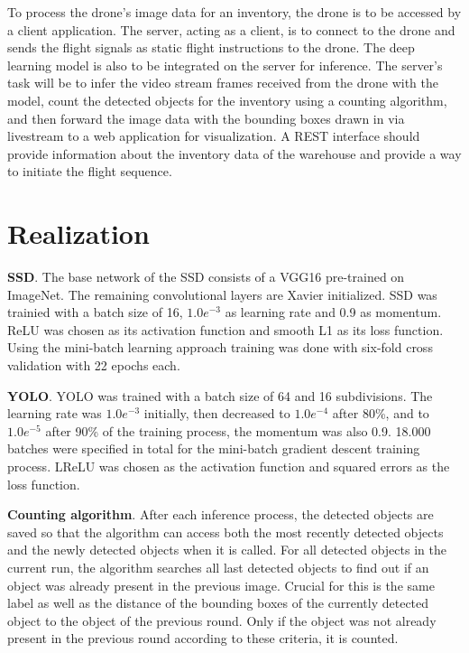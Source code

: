\documentclass[a4paper, 10pt, journal]{wissarbIEEE}      %
\begin{document}
To process the drone's image data for an inventory, the drone is to be accessed by a client application. The server, acting as a client, is to connect to the drone and sends the flight signals as static flight instructions to the drone. The deep learning model is also to be integrated on the server for inference. The server's task will be to infer the video stream frames received from the drone with the model, count the detected objects for the inventory using a counting algorithm, and then forward the image data with the bounding boxes drawn in via livestream to a web application for visualization. A REST interface should provide information about the inventory data of the warehouse and provide a way to initiate the flight sequence.

\section{Realization} \label{realization}

\textbf{SSD}. The base network of the SSD consists of a VGG16 pre-trained on ImageNet. The remaining convolutional layers are Xavier initialized. SSD was trainied with a batch size of 16, $1.0e^{-3}$ as learning rate and 0.9 as momentum. ReLU was chosen as its activation function and smooth L1 as its loss function. Using the mini-batch learning approach training was done with six-fold cross validation with 22 epochs each.

\textbf{YOLO}. YOLO was trained with a batch size of 64 and 16 subdivisions. The learning rate was $1.0e^{-3}$ initially, then decreased to $1.0e^{-4}$ after 80\%, and to $1.0e^{-5}$ after 90\% of the training process, the momentum was also 0.9. 18.000 batches were specified in total for the mini-batch gradient descent training process. LReLU was chosen as the activation function and squared errors as the loss function.

\textbf{Counting algorithm}. After each inference process, the detected objects are saved so that the algorithm can access both the most recently detected objects and the newly detected objects when it is called. For all detected objects in the current run, the algorithm searches all last detected objects to find out if an object was already present in the previous image. Crucial for this is the same label as well as the distance of the bounding boxes of the currently detected object to the object of the previous round. Only if the object was not already present in the previous round according to these criteria, it is counted.
\end{document}
